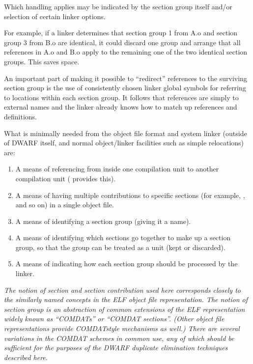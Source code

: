 Which handling applies may be indicated by the section group
itself and/or selection of certain linker options.

For example, if a linker determines that section group 1
from A.o and section group 3 from B.o are identical, it could
discard one group and arrange that all references in A.o and
B.o apply to the remaining one of the two identical section
groups. This saves space.

An important part of making it possible to “redirect”
references to the surviving section group is the use of
consistently chosen linker global symbols for referring to
locations within each section group. It follows that references
are simply to external names and the linker already knows
how to match up references and definitions.

What is minimally needed from the object file format and system
linker (outside of DWARF itself, and normal object/linker
facilities such as simple relocations) are:

\begin{enumerate}[1.]

\item A means of referencing from inside one 
compilation unit to another 
 compilation unit
( provides this).

\item A means of having multiple contributions to specific sections
(for example, , and so on) in a single object file.

\item  A means of identifying a section group (giving it a name).

\item A means of identifying which sections go together to make
up a section group, so that the group can be treated as a unit
(kept or discarded).

\item  A means of indicating how each section group should be
processed by the linker.

\end{enumerate}

\textit{The notion of section and section contribution used here
corresponds closely to the similarly named concepts in the
ELF object file representation. The notion of section group is
an abstraction of common extensions of the ELF representation
widely known as ``COMDATs'' or ``COMDAT sections''. (Other
object file representations provide COMDAT\dash style mechanisms as
well.) There are several variations in the COMDAT schemes in
common use, any of which should be sufficient for the purposes
of the 
DWARF duplicate elimination techniques described here.}

